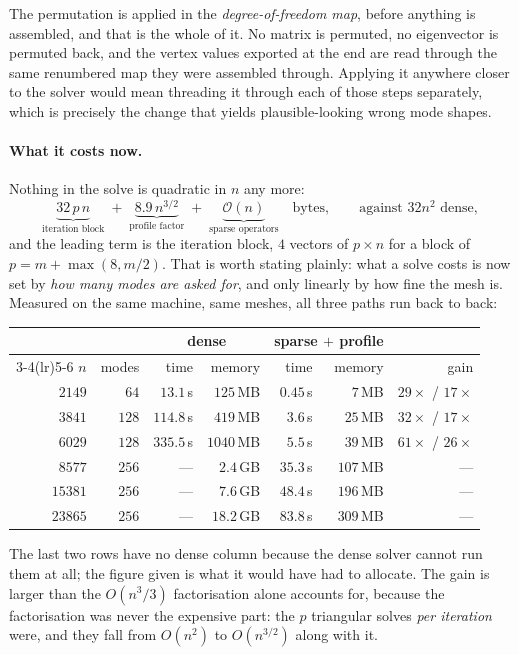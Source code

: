 \documentclass[11pt,a4paper]{article}
\begin{document}
The permutation is applied in the \emph{degree-of-freedom map}, before
anything is assembled, and that is the whole of it. No matrix is permuted,
no eigenvector is permuted back, and the vertex values exported at the end
are read through the same renumbered map they were assembled through.
Applying it anywhere closer to the solver would mean threading it through
each of those steps separately, which is precisely the change that yields
plausible-looking wrong mode shapes.

\paragraph{What it costs now.}
Nothing in the solve is quadratic in $n$ any more:
%
\begin{equation}
  \underbrace{32\,p\,n}_{\text{iteration block}}
  \;+\; \underbrace{8.9\,n^{3/2}}_{\text{profile factor}}
  \;+\; \underbrace{\mathcal{O}(n)}_{\text{sparse operators}}
  \quad\text{bytes},
  \qquad\text{against } 32 n^2 \text{ dense},
  \label{eq:footprint}
\end{equation}
%
and the leading term is the iteration block, $4$ vectors of $p \times n$
for a block of $p = m + \max(8, m/2)$. That is worth stating plainly: what
a solve costs is now set by \emph{how many modes are asked for}, and only
linearly by how fine the mesh is. Measured on the same machine, same
meshes, all three paths run back to back:
%
\begin{center}
\begin{tabular}{rrrrrrr}
\toprule
& & \multicolumn{2}{c}{dense} & \multicolumn{2}{c}{sparse $+$ profile} & \\
\cmidrule(lr){3-4}\cmidrule(lr){5-6}
$n$ & modes & time & memory & time & memory & gain \\
\midrule
$2149$ & $64$  & $13.1$\,s  & $125$\,MB  & $0.45$\,s & $7$\,MB  & $29\times$ / $17\times$ \\
$3841$ & $128$ & $114.8$\,s & $419$\,MB  & $3.6$\,s  & $25$\,MB & $32\times$ / $17\times$ \\
$6029$ & $128$ & $335.5$\,s & $1040$\,MB & $5.5$\,s  & $39$\,MB & $61\times$ / $26\times$ \\
$8577$ & $256$ & ---        & $2.4$\,GB  & $35.3$\,s & $107$\,MB & --- \\
$15381$ & $256$ & ---       & $7.6$\,GB  & $48.4$\,s & $196$\,MB & --- \\
$23865$ & $256$ & ---       & $18.2$\,GB & $83.8$\,s & $309$\,MB & --- \\
\bottomrule
\end{tabular}
\end{center}
%
The last two rows have no dense column because the dense solver cannot run
them at all; the figure given is what it would have had to allocate. The
gain is larger than the $O(n^3/3)$ factorisation alone accounts for,
because the factorisation was never the expensive part: the $p$ triangular
solves \emph{per iteration} were, and they fall from $O(n^2)$ to
$O(n^{3/2})$ along with it.
\end{document}
